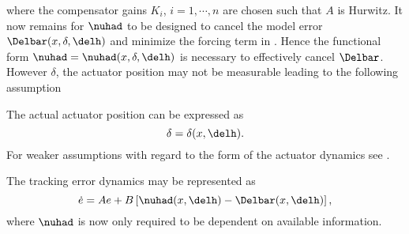 where the compensator gains $K_i$, $i=1,\cdots,n$ are chosen such
that $A$ is Hurwitz. It now remains for $\nuhad$ to be designed to
cancel the model error $\Delbar(x,\delta,\delh)$ and minimize the
forcing term in . Hence the functional form $\nuhad
= \nuhad(x,\delta,\delh)$ is necessary to effectively cancel
$\Delbar$. However $\delta$, the actuator position may not be
measurable leading to the following assumption
\begin{assumption}
\label{ass:simple:ImplicitActuator} The actual actuator position can
be expressed as
\[
\delta = \delta(x,\delh).
\]
For weaker assumptions with regard to the form of the actuator
dynamics see \cite{kannan:phd}.
\end{assumption}
The tracking error dynamics may be represented as
\begin{equation}
\label{e:simple:Trackedot} \dot{e} = Ae + B\left[ \nuhad(x,\delh) -
\Delbar(x,\delh)\right],
\end{equation}
where $\nuhad$ is now only required to be dependent on available
information.

